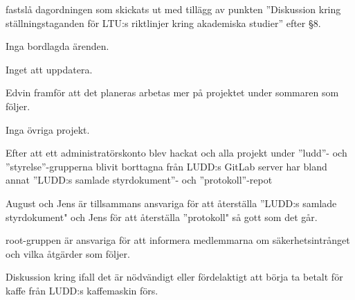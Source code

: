 \documentclass{protokoll}
\begin{document}
\newpage  


\begin{beslut}
     \att fastslå dagordningen som skickats ut med tillägg av punkten
     ''Diskussion kring ställningstaganden för LTU:s riktlinjer kring
     akademiska studier'' efter \S 8.
\end{beslut}

Inga bordlagda ärenden.

Inget att uppdatera. 

Edvin framför att det planeras arbetas mer på projektet under sommaren som
följer. 

Inga övriga projekt. 

Efter att ett administratörskonto blev hackat och alla projekt under ''ludd''-
och ''styrelse''-grupperna blivit borttagna från LUDD:s GitLab server har bland
annat ''LUDD:s samlade styrdokument''- och ''protokoll''-repot

August och Jens är tillsammans ansvariga för att återställa ''LUDD:s samlade 
styrdokument" och Jens för att återställa ''protokoll" så gott som det går. 

root-gruppen är ansvariga för att informera medlemmarna om säkerhetsintrånget
och vilka åtgärder som följer.

 Diskussion kring ifall det är nödvändigt eller fördelaktigt att börja ta
 betalt för kaffe från LUDD:s kaffemaskin förs. 
\end{document}
